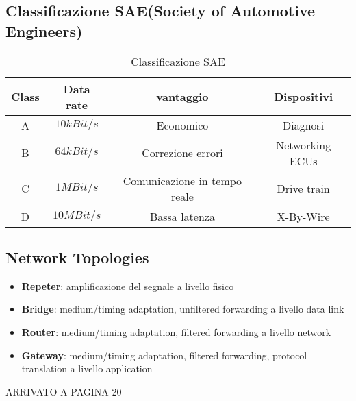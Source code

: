 \subsection{Classificazione SAE(Society of Automotive Engineers)}

\begin{table}
	\begin{adjustbox}{width=\columnwidth, center}
		\begin{tabular}{|c|c|c|c|}
			\hline
			Class & Data rate  & vantaggio                    & Dispositivi     \\
			\hline
			A     & $10kBit/s$ & Economico                    & Diagnosi        \\
			B     & $64kBit/s$ & Correzione errori            & Networking ECUs \\
			C     & $1MBit/s$  & Comunicazione in tempo reale & Drive train     \\
			D     & $10MBit/s$ & Bassa latenza                & X-By-Wire       \\
			\hline
		\end{tabular}
	\end{adjustbox}
	\caption{Classificazione SAE}
	\label{tab:classification_sae}
\end{table}



\subsection{Network Topologies}

\begin{itemize}
	\item \textbf{Repeter}: amplificazione del segnale a livello fisico
	\item \textbf{Bridge}: medium/timing adaptation, unfiltered forwarding a livello data link
	\item \textbf{Router}: medium/timing adaptation, filtered forwarding a livello network
	\item \textbf{Gateway}: medium/timing adaptation, filtered forwarding, protocol translation a livello application
\end{itemize}




ARRIVATO A PAGINA 20
